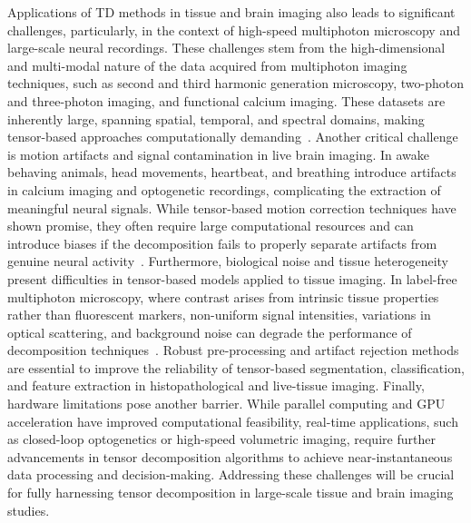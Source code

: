 Applications of TD methods in tissue and brain imaging also leads to significant challenges, particularly, in the context of high-speed multiphoton microscopy and large-scale neural recordings. These challenges stem from the high-dimensional and multi-modal nature of the data acquired from multiphoton imaging techniques, such as second and third harmonic generation microscopy, two-photon and three-photon imaging, and functional calcium imaging. These datasets are inherently large, spanning spatial, temporal, and spectral domains, making tensor-based approaches computationally demanding~\cite{kolda2009tensor}. Another critical challenge is motion artifacts and signal contamination in live brain imaging. In awake behaving animals, head movements, heartbeat, and breathing introduce artifacts in calcium imaging and optogenetic recordings, complicating the extraction of meaningful neural signals. While tensor-based motion correction techniques have shown promise, they often require large computational resources and can introduce biases if the decomposition fails to properly separate artifacts from genuine neural activity~\cite{kara2024facilitating}. 
Furthermore, biological noise and tissue heterogeneity present difficulties in tensor-based models applied to tissue imaging. In label-free multiphoton microscopy, where contrast arises from intrinsic tissue properties rather than fluorescent markers, non-uniform signal intensities, variations in optical scattering, and background noise can degrade the performance of decomposition techniques~\cite{borile2021label}. Robust pre-processing and artifact rejection methods are essential to improve the reliability of tensor-based segmentation, classification, and feature extraction in histopathological and live-tissue imaging. Finally, hardware limitations pose another barrier. While parallel computing and GPU acceleration have improved computational feasibility, real-time applications, such as closed-loop optogenetics or high-speed volumetric imaging, require further advancements in tensor decomposition algorithms to achieve near-instantaneous data processing and decision-making. Addressing these challenges will be crucial for fully harnessing tensor decomposition in large-scale tissue and brain imaging studies.

